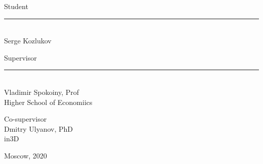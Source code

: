 \begin{flushright}
Student\\
\medskip
\rule{3cm}{.1pt}\\
Serge Kozlukov

\vspace{13pt}

Supervisor\\
\medskip
\rule{3cm}{.1pt}\\
Vladimir Spokoiny, Prof\\
Higher School of Economiics

\vspace{13pt}

Co-supervisor\\
Dmitry Ulyanov, PhD\\
in3D

\end{flushright}

\vspace*{\fill}

\begin{center}
Moscow, 2020
\end{center}

